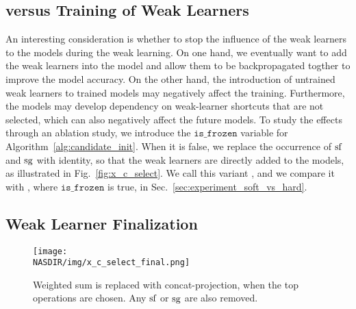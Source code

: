\subsection{\petridishhard versus \petridishsoft Training of Weak Learners}
\label{sec:soft_vs_hard}
An interesting consideration is whether to stop the influence of the weak learners to the models during the weak learning. 
On one hand, we eventually want to add the weak learners into the model and allow them to be backpropagated togther
to improve the model accuracy.
On the other hand, the introduction of 
untrained weak learners to trained models may negatively affect the training. Furthermore, the models may develop dependency on weak-learner shortcuts 
that are not selected, which can also negatively affect the future models. 
To study the effects through an ablation study, we introduce the $\texttt{is\_frozen}$ variable for Algorithm~\ref{alg:candidate_init}. 
When it is false, we replace the occurrence of $\textrm{sf}$ and $\textrm{sg}$ with identity, so that the weak learners are directly added to the models, 
as illustrated in Fig.~\ref{fig:x_c_select}. We call this variant
\petridishsoft, and we compare it with \petridishhard, where $\texttt{is\_frozen}$ is true, in Sec.~\ref{sec:experiment_soft_vs_hard}. 





\subsection{Weak Learner Finalization}
\label{sec:candidate_finalize}

\begin{figure}[t]
\centering
    \texttt{[image: \\NASDIR/img/x\_c\_select\_final.png]}
    \caption{Weighted sum is replaced with concat-projection, when the top operations are chosen. Any $\textrm{sf}$ or $\textrm{sg}$ are also removed.}
    \label{fig:x_c_select_final}
\end{figure}

